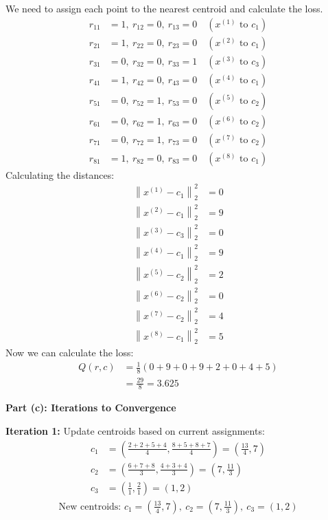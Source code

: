 We need to assign each point to the nearest centroid and calculate the loss.
\begin{align*}
r_{11} &= 1, \ r_{12} = 0, \ r_{13} = 0 \quad (x^{(1)} \text{ to } c_1)\\
r_{21} &= 1, \ r_{22} = 0, \ r_{23} = 0 \quad (x^{(2)} \text{ to } c_1)\\
r_{31} &= 0, \ r_{32} = 0, \ r_{33} = 1 \quad (x^{(3)} \text{ to } c_3)\\
r_{41} &= 1, \ r_{42} = 0, \ r_{43} = 0 \quad (x^{(4)} \text{ to } c_1)\\
r_{51} &= 0, \ r_{52} = 1, \ r_{53} = 0 \quad (x^{(5)} \text{ to } c_2)\\
r_{61} &= 0, \ r_{62} = 1, \ r_{63} = 0 \quad (x^{(6)} \text{ to } c_2)\\
r_{71} &= 0, \ r_{72} = 1, \ r_{73} = 0 \quad (x^{(7)} \text{ to } c_2)\\
r_{81} &= 1, \ r_{82} = 0, \ r_{83} = 0 \quad (x^{(8)} \text{ to } c_1)
\end{align*}
Calculating the distances:
\begin{align*}
\left\|x^{(1)} - c_1\right\|_2^2 &= 0 \\
\left\|x^{(2)} - c_1\right\|_2^2 &= 9 \\
\left\|x^{(3)} - c_3\right\|_2^2 &= 0 \\
\left\|x^{(4)} - c_1\right\|_2^2 &= 9 \\
\left\|x^{(5)} - c_2\right\|_2^2 &= 2 \\
\left\|x^{(6)} - c_2\right\|_2^2 &= 0 \\
\left\|x^{(7)} - c_2\right\|_2^2 &= 4 \\
\left\|x^{(8)} - c_1\right\|_2^2 &= 5
\end{align*}
Now we can calculate the loss:
\begin{align*}
Q(r,c) &= \frac{1}{8} \left( 0 + 9 + 0 + 9 + 2 + 0 + 4 + 5 \right) \\
&= \frac{29}{8} = 3.625
\end{align*}



\textbf{Part (c): Iterations to Convergence}

\textbf{Iteration 1:}
Update centroids based on current assignments:
\begin{align*}
c_1 &= \left( \frac{2+2+5+4}{4}, \frac{8+5+8+7}{4} \right) = (\frac{13}{4}, 7) \\
c_2 &= \left( \frac{6+7+8}{3}, \frac{4+3+4}{3} \right) = (7, \frac{11}{3}) \\
c_3 &= \left( \frac{1}{1}, \frac{2}{1} \right) = (1, 2)
\end{align*}
\begin{align*}
\text{New centroids: } c_1 = (\frac{13}{4}, 7), \ c_2 = (7, \frac{11}{3}), \ c_3 = (1, 2)
\end{align*}

